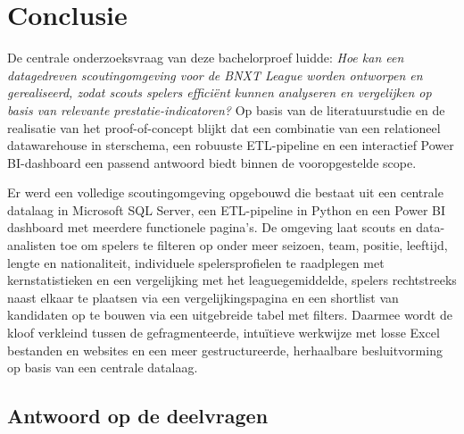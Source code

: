 
\chapter{Conclusie}%
\label{ch:conclusie}


De centrale onderzoeksvraag van deze bachelorproef luidde: \textit{Hoe kan een datagedreven scoutingomgeving voor de BNXT League worden ontworpen en gerealiseerd, zodat scouts spelers efficiënt kunnen analyseren en vergelijken op basis van relevante prestatie-indicatoren?} Op basis van de literatuurstudie en de realisatie van het proof-of-concept blijkt dat een combinatie van een relationeel datawarehouse in sterschema, een robuuste ETL-pipeline en een interactief Power BI-dashboard een passend antwoord biedt binnen de vooropgestelde scope.

Er werd een volledige scoutingomgeving opgebouwd die bestaat uit een centrale datalaag in Microsoft SQL Server, een ETL-pipeline in Python en een Power BI dashboard met meerdere functionele pagina's. De omgeving laat scouts en data-analisten toe om spelers te filteren op onder meer seizoen, team, positie, leeftijd, lengte en nationaliteit, individuele spelersprofielen te raadplegen met kernstatistieken en een vergelijking met het leaguegemiddelde, spelers rechtstreeks naast elkaar te plaatsen via een vergelijkingspagina en een shortlist van kandidaten op te bouwen via een uitgebreide tabel met filters. Daarmee wordt de kloof verkleind tussen de gefragmenteerde, intuïtieve werkwijze met losse Excel bestanden en websites en een meer gestructureerde, herhaalbare besluitvorming op basis van een centrale datalaag.

\section*{Antwoord op de deelvragen}

